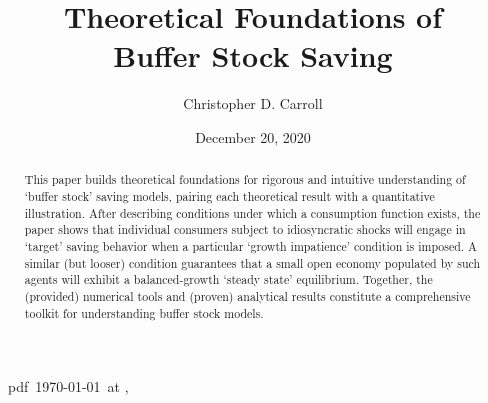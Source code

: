 \documentclass[BufferStockTheory]{subfiles}
\begin{document}
\providecommand{\versn}{pdf} %
\ifthenelse{\boolean{Web}}{    %
  \renewcommand{\versn}{Web}     %
  \renewcommand{\rootFromOut}{.} %
}{}  %

\hfill{\tiny \jobname~\versn~\today~{at} \DTMcurrenttime, ~~}

\title{Theoretical Foundations of \\ Buffer Stock Saving}

\author{Christopher D. Carroll\authNum}



\renewcommand{\forcedate}{December 20, 2020}
\date{\forcedate} %

\maketitle 
\hypertarget{abstract}{}
\begin{abstract}
  This paper builds theoretical foundations for rigorous and intuitive understanding of `buffer stock' saving models, pairing each theoretical result with a quantitative illustration.  After describing conditions under which a consumption function exists, the paper shows that individual consumers subject to idiosyncratic shocks will engage in `target' saving behavior when a particular `growth impatience' condition is imposed.  A similar (but looser) condition guarantees that a small open economy populated by such agents will exhibit a balanced-growth `steady state' equilibrium.  Together, the (provided) numerical tools and (proven) analytical results constitute a comprehensive toolkit for understanding buffer stock models.
\end{abstract}
\end{document}
